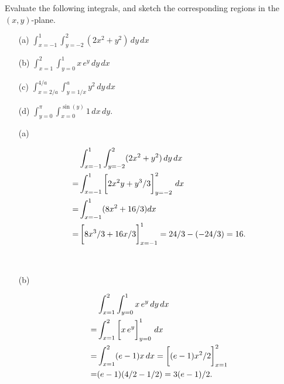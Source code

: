 \documentclass[a4paper]{amsart}
\renewenvironment{solution}{\SolutionInline}{\endSolutionInline}
\begin{document}
\begin{exercise}
 Evaluate the following integrals, and sketch the corresponding
 regions in the $(x,y)$-plane. 
 \begin{itemize}
  \item[(a)] $\int_{x=-1}^1\int_{y=-2}^2(2x^2+y^2)\,dy\,dx$
  \item[(b)] $\int_{x=1}^2\int_{y=0}^1x\,e^y\,dy\,dx$
  \item[(c)] $\int_{x=2/a}^{4/a}\int_{y=1/x}^a y^2\,dy\,dx$
  \item[(d)] $\int_{y=0}^\pi\int_{x=0}^{\sin(y)} 1\,dx\,dy$.
 \end{itemize}
\end{exercise}
\begin{solution}
 \begin{itemize}
  \item[(a)]
   \begin{minipage}[t]{11cm}
     \begin{align*}
       & \int_{x=-1}^1\int_{y=-2}^2(2x^2+y^2)\,dy\,dx \\
       =&\int_{x=-1}^1\CH{2x^2y+y^3/3}_{y=-2}^2\,dx \\
       =&\int_{x=-1}^1(8x^2+16/3)dx \\
       =&\CH{8x^3/3+16x/3}_{x=-1}^1=24/3-(-24/3)=16.
     \end{align*}\hfill
   \end{minipage} \hfill \parbox[t]{5cm}{
   }\\[2ex]
  \item[(b)]
   \begin{minipage}[t]{11cm}
     \begin{align*}
      & \int_{x=1}^2\int_{y=0}^1x\,e^y\,dy\,dx \\
     =& \int_{x=1}^2\CH{x\,e^y}_{y=0}^1\,dx \\
     =& \int_{x=1}^2(e-1)x\,dx=\CH{(e-1)x^2/2}_{x=1}^2 \\ 
     =& (e-1)(4/2-1/2)=3(e-1)/2.
     \end{align*}\hfill
   \end{minipage} \hfill \parbox[t]{5cm}{
     \begin{tikzpicture}[scale=1.8,baseline=(current bounding box.north)]

\end{tikzpicture}}
\end{itemize}
\end{solution}
\end{document}
